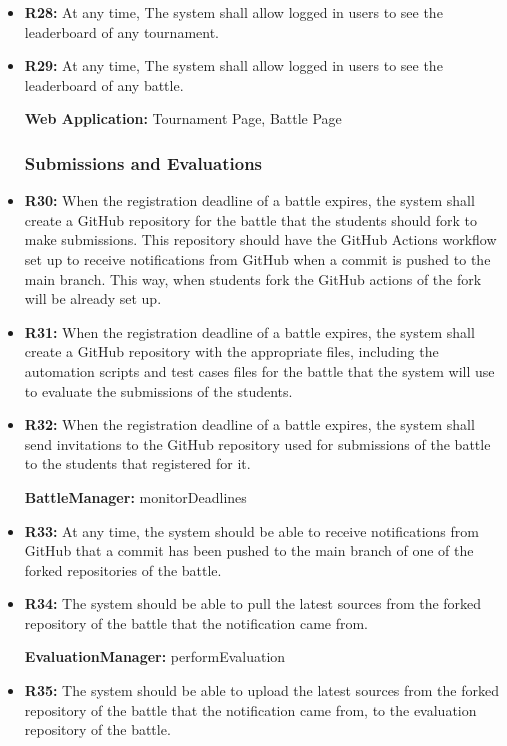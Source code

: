 \documentclass{article}
\begin{document}
\begin{itemize}
    \item \textbf{R28:} At any time, The system shall allow logged in users to see the leaderboard of any tournament.
    \item \textbf{R29:} At any time, The system shall allow logged in users to see the leaderboard of any battle.
    
    \textbf{Web Application:} Tournament Page, Battle Page

    \subsubsection*{Submissions and Evaluations}

    \item \textbf{R30:} When the registration deadline of a battle expires, the system shall create a GitHub repository for the battle that the students should fork to make submissions. This repository should have the GitHub Actions workflow set up to receive notifications from GitHub when a commit is pushed to the main branch. This way, when students fork the GitHub actions of the fork will be already set up.
    \item \textbf{R31:} When the registration deadline of a battle expires, the system shall create a GitHub repository with the appropriate files, including the automation scripts and test cases files for the battle that the system will use to evaluate the submissions of the students.
    \item \textbf{R32:} When the registration deadline of a battle expires, the system shall send invitations to the GitHub repository used for submissions of the battle to the students that registered for it.
    
    \textbf{BattleManager:} monitorDeadlines

    \item \textbf{R33:} At any time, the system should be able to receive notifications from GitHub that a commit has been pushed to the main branch of one of the forked repositories of the battle.
    \item \textbf{R34:} The system should be able to pull the latest sources from the forked repository of the battle that the notification came from.
    
    \textbf{EvaluationManager:} performEvaluation

    \item \textbf{R35:} The system should be able to upload the latest sources from the forked repository of the battle that the notification came from, to the evaluation repository of the battle.
    

\end{itemize}
\end{document}
